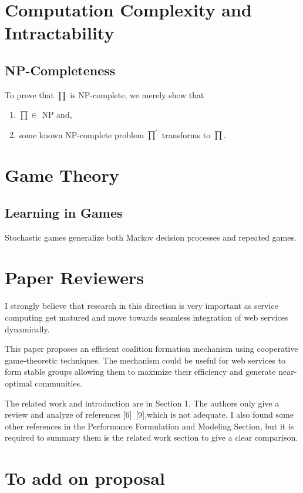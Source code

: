 \documentclass{article}
\begin{document}
\section{Computation Complexity and Intractability}

\subsection{NP-Completeness}

To prove that $\prod$ is NP-complete, we merely show that \cite{Garey:1990:CIG:574848}

\begin{enumerate}
\item $\prod \in$ NP and,
\item some known NP-complete problem $\prod^\prime$ transforms to $\prod$.
\end{enumerate}

\section{Game Theory}

\subsection{Learning in Games}
Stochastic games generalize both Markov decision processes and repeated games.

\section{Paper Reviewers}
I strongly believe that research in this direction is very important as service computing get matured and move towards seamless integration of web services dynamically.

This paper proposes an efficient coalition formation mechanism using cooperative game-theoretic techniques. The mechanism could be useful for web services to form stable groups allowing them to maximize their efficiency and generate near-optimal communities.

The related work and introduction are in Section 1. The authors only give a review and analyze of references [6]~[9],which is not adequate. I also found some other references in the Performance Formulation and Modeling Section, but it is required to summary them is the related work section to give a clear comparison.


\section{To add on proposal}
\end{document}

